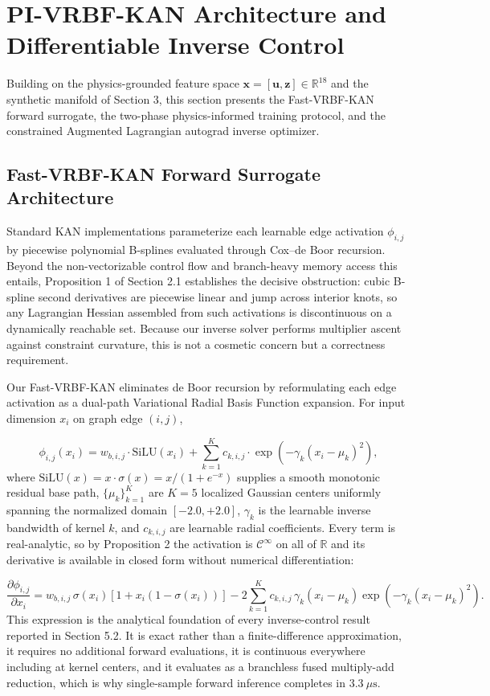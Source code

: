 \documentclass[10pt,journal,onecolumn]{IEEEtran}
\begin{document}
\section{PI-VRBF-KAN Architecture and Differentiable Inverse Control}
Building on the physics-grounded feature space $\mathbf{x} = [\mathbf{u}, \mathbf{z}] \in \mathbb{R}^{18}$ and the synthetic manifold of Section 3, this section presents the Fast-VRBF-KAN forward surrogate, the two-phase physics-informed training protocol, and the constrained Augmented Lagrangian autograd inverse optimizer.

\subsection{Fast-VRBF-KAN Forward Surrogate Architecture}
Standard KAN implementations parameterize each learnable edge activation $\phi_{i,j}$ by piecewise polynomial B-splines evaluated through Cox–de Boor recursion. Beyond the non-vectorizable control flow and branch-heavy memory access this entails, Proposition 1 of Section 2.1 establishes the decisive obstruction: cubic B-spline second derivatives are piecewise linear and jump across interior knots, so any Lagrangian Hessian assembled from such activations is discontinuous on a dynamically reachable set. Because our inverse solver performs multiplier ascent against constraint curvature, this is not a cosmetic concern but a correctness requirement.

Our Fast-VRBF-KAN eliminates de Boor recursion by reformulating each edge activation as a dual-path Variational Radial Basis Function expansion. For input dimension $x_i$ on graph edge $(i, j)$,

\begin{equation}
\phi_{i,j}(x_i) = w_{b,i,j} \cdot \text{SiLU}(x_i) + \sum_{k=1}^{K} c_{k,i,j} \cdot \exp\!\left(-\gamma_k (x_i - \mu_k)^2\right),
\end{equation}
where $\text{SiLU}(x) = x \cdot \sigma(x) = x / (1 + e^{-x})$ supplies a smooth monotonic residual base path, $\{\mu_k\}_{k=1}^{K}$ are $K = 5$ localized Gaussian centers uniformly spanning the normalized domain $[-2.0, +2.0]$, $\gamma_k$ is the learnable inverse bandwidth of kernel $k$, and $c_{k,i,j}$ are learnable radial coefficients. Every term is real-analytic, so by Proposition 2 the activation is $\mathcal{C}^\infty$ on all of $\mathbb{R}$ and its derivative is available in closed form without numerical differentiation:

\begin{equation}
\frac{\partial \phi_{i,j}}{\partial x_i} = w_{b,i,j}\,\sigma(x_i)\!\left[1 + x_i\left(1 - \sigma(x_i)\right)\right] - 2\sum_{k=1}^{K} c_{k,i,j}\,\gamma_k(x_i - \mu_k)\exp\!\left(-\gamma_k(x_i - \mu_k)^2\right).
\end{equation}
This expression is the analytical foundation of every inverse-control result reported in Section 5.2. It is exact rather than a finite-difference approximation, it requires no additional forward evaluations, it is continuous everywhere including at kernel centers, and it evaluates as a branchless fused multiply-add reduction, which is why single-sample forward inference completes in $3.3\ \mu\text{s}$.
\end{document}
